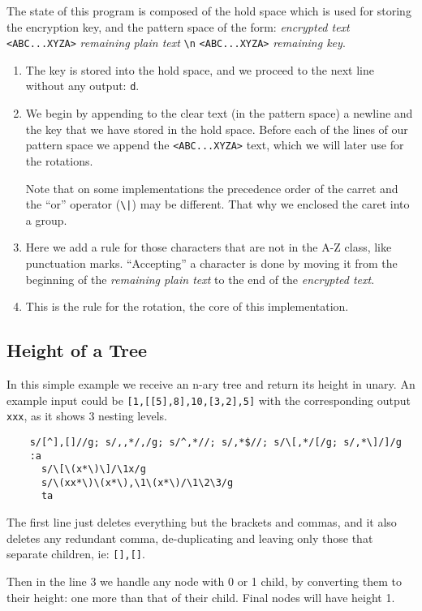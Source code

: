 The state of this program is composed of the hold space which is used for
storing the encryption key, and the pattern space of the form: \emph{encrypted
text} \verb|<ABC...XYZA>| \emph{remaining plain text} \verb|\n|
\verb|<ABC...XYZA>| \emph{remaining key}.

\begin{enumerate}
	\item The key is stored into the hold space, and we proceed to the next
		line without any output: {\tt d}.
	\item We begin by appending to the clear text (in the pattern space) a
		newline and the key that we have stored in the hold space.  Before each
		of the lines of our pattern space we append the {\tt <ABC...XYZA>} text,
		which we will later use for the rotations.

		Note that on some implementations the precedence order of the carret
		and the ``or'' operator (\verb:\|:) may be different.  That why we
		enclosed the caret into a group.
	\addtocounter{enumi}{1}
	\item Here we add a rule for those characters that are not in the A-Z
		class, like punctuation marks.  ``Accepting'' a character is done
		by moving it from the beginning of the \emph{remaining plain text} to
		the end of the \emph{encrypted text}.
    \item This is the rule for the rotation, the core of this implementation.
\end{enumerate}

\subsection{Height of a Tree}

In this simple example we receive an n-ary tree and return its height in
unary.  An example input could be \verb|[1,[[5],8],10,[3,2],5]| with the
corresponding output \verb|xxx|, as it shows 3 nesting levels.

\begin{Verbatim}
	s/[^],[]//g; s/,,*/,/g; s/^,*//; s/,*$//; s/\[,*/[/g; s/,*\]/]/g
	:a
	  s/\[\(x*\)\]/\1x/g
	  s/\(xx*\)\(x*\),\1\(x*\)/\1\2\3/g
	  ta
\end{Verbatim}

The first line just deletes everything but the brackets and commas, and
it also deletes any redundant comma, de-duplicating and leaving only
those that separate children, ie: {\tt [],[]}.

Then in the line 3 we handle any node with 0 or 1 child, by converting
them to their height: one more than that of their child.  Final nodes will
have height 1.


